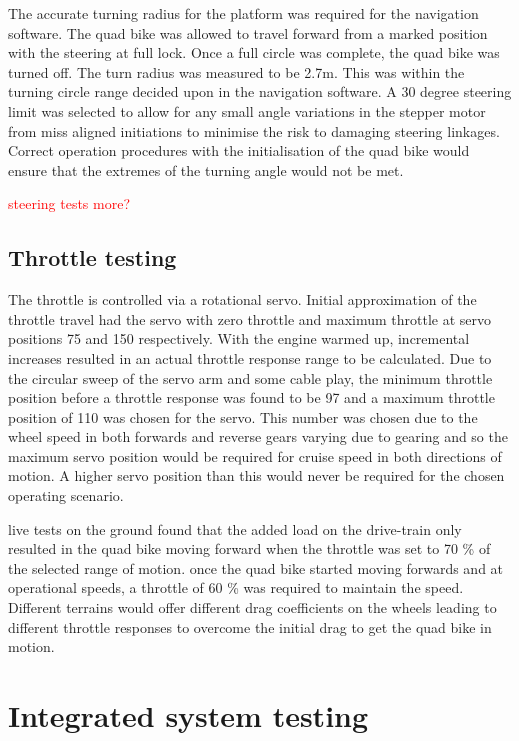 \documentclass[main.tex]{subfiles}
\begin{document}
The accurate turning radius for the platform was required for the navigation software. The quad bike was allowed to travel forward from a marked position with the steering at full lock. Once a full circle was complete, the quad bike was turned off. The turn radius was measured to be 2.7m. This was within the turning circle range decided upon in the navigation software. A 30 degree steering limit was selected to allow for any small angle variations in the stepper motor from miss aligned initiations to minimise the risk to damaging steering linkages. Correct operation procedures with the initialisation of the quad bike would ensure that the extremes of the turning angle would not be met. 

\textcolor{red}{steering tests more?}

\subsection{Throttle testing}
The throttle is controlled via a rotational servo. Initial approximation of the throttle travel had the servo with zero throttle and maximum throttle at servo positions 75 and 150 respectively. With the engine warmed up, incremental increases resulted in an actual throttle response range to be calculated. Due to the circular sweep of the servo arm and some cable play, the minimum throttle position before a throttle response was found to be 97 and a maximum throttle position of 110 was chosen for the servo. This number was chosen due to the wheel speed in both forwards and reverse gears varying due to gearing and so the maximum servo position would be required for cruise speed in both directions of motion. A higher servo position than this would never be required for the chosen operating scenario.

live tests on the ground found that the added load on the drive-train only resulted in the quad bike moving forward when the throttle was set to 70 \% of the selected range of motion. once the quad bike started moving forwards and at operational speeds, a throttle of 60 \% was required to maintain the speed. Different terrains would offer different drag coefficients on the wheels leading to different throttle responses to overcome the initial drag to get the quad bike in motion. 

\section{Integrated system testing}
\end{document}
